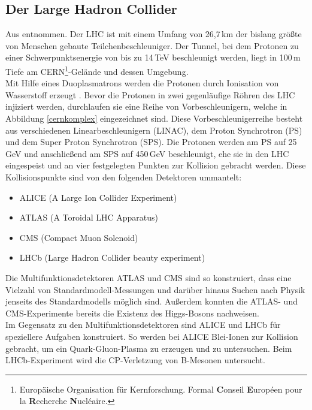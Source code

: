 \subsection{Der Large Hadron Collider}
Aus \cite{ref:stoever} entnommen. Der LHC ist mit einem Umfang von 26,7\,km der bislang größte von Menschen gebaute Teilchenbeschleuniger. Der Tunnel, bei dem Protonen zu einer Schwerpunktsenergie von bis zu 14\,TeV beschleunigt werden, liegt in 100\,m Tiefe am CERN\footnote{Europäische Organisation für Kernforschung. Formal \textbf{C}onseil \textbf{E}uropéen pour la \textbf{R}echerche \textbf{N}ucléaire.}-Gelände und dessen Umgebung.\\
Mit Hilfe eines Duoplasmatrons werden die Protonen durch Ionisation von Wasserstoff erzeugt \cite{duoplasma}. Bevor die Protonen in zwei gegenläufige Röhren des LHC injiziert werden, durchlaufen sie eine Reihe von Vorbeschleunigern, welche in Abbildung \ref{cernkomplex} eingezeichnet sind. 
Diese Vor\-be\-schleuniger\-reihe besteht aus verschiedenen Linearbeschleunigern (LINAC), dem Proton Synchrotron (PS) und dem Super Proton Synchrotron (SPS). Die Protonen werden am PS auf 25\,GeV und anschließend am SPS auf 450\,GeV beschleunigt, ehe sie in den LHC eingespeist und an vier festgelegten Punkten zur Kollision gebracht werden. Diese Kollisionspunkte sind von den folgenden Detektoren ummantelt:
\begin{itemize}
\item ALICE (A Large Ion Collider Experiment)
\item ATLAS (A Toroidal LHC Apparatus)
\item CMS (Compact Muon Solenoid)
\item LHCb (Large Hadron Collider beauty experiment)
\end{itemize}
Die Multifunktionsdetektoren ATLAS \cite{atlas} und CMS sind so konstruiert, dass eine Vielzahl von Standardmodell-Messungen und darüber hinaus Suchen nach Physik jenseits des Standardmodells möglich sind. Außerdem konnten die ATLAS- und CMS-Experimente bereits die Existenz des Higgs-Bosons nachweisen.\\
Im Gegensatz zu den Multifunktionsdetektoren sind ALICE \cite{alice} und LHCb \cite{lhcb} für speziellere Aufgaben konstruiert. So werden bei ALICE Blei-Ionen zur Kollision gebracht, um ein Quark-Gluon-Plasma zu erzeugen und zu untersuchen. Beim LHCb-Experiment wird die CP-Verletzung von B-Mesonen untersucht.
